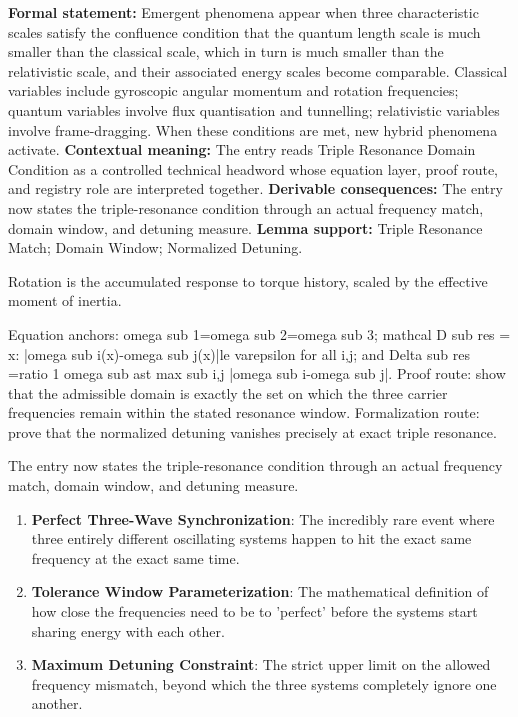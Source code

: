\begingroup\footnotesize\setlength{\emergencystretch}{3em}\sloppy
\textbf{Formal statement:} Emergent phenomena appear when three characteristic scales satisfy the confluence condition that the quantum length scale is much smaller than the classical scale, which in turn is much smaller than the relativistic scale, and their associated energy scales become comparable. Classical variables include gyroscopic angular momentum and rotation frequencies; quantum variables involve flux quantisation and tunnelling; relativistic variables involve frame-dragging. When these conditions are met, new hybrid phenomena activate. \textbf{Contextual meaning:} The entry reads Triple Resonance Domain Condition as a controlled technical headword whose equation layer, proof route, and registry role are interpreted together. \textbf{Derivable consequences:} The entry now states the triple-resonance condition through an actual frequency match, domain window, and detuning measure. \textbf{Lemma support:} Triple Resonance Match; Domain Window; Normalized Detuning.\par
\endgroup

Rotation is the accumulated response to torque history, scaled by the effective moment of inertia.

Equation anchors: omega sub 1=omega sub 2=omega sub 3; mathcal D sub res = x: |omega sub i(x)-omega sub j(x)|le varepsilon for all i,j; and Delta sub res =ratio 1 omega sub ast max sub i,j |omega sub i-omega sub j|. Proof route: show that the admissible domain is exactly the set on which the three carrier frequencies remain within the stated resonance window. Formalization route: prove that the normalized detuning vanishes precisely at exact triple resonance.

The entry now states the triple-resonance condition through an actual frequency match, domain window, and detuning measure.
\endgroup

\begin{enumerate}[leftmargin=1.6em,itemsep=6pt,topsep=4pt]
\item \textbf{Perfect Three-Wave Synchronization}: The incredibly rare event where three entirely different oscillating systems happen to hit the exact same frequency at the exact same time.
\item \textbf{Tolerance Window Parameterization}: The mathematical definition of how close the frequencies need to be to 'perfect' before the systems start sharing energy with each other.
\item \textbf{Maximum Detuning Constraint}: The strict upper limit on the allowed frequency mismatch, beyond which the three systems completely ignore one another.
\end{enumerate}

